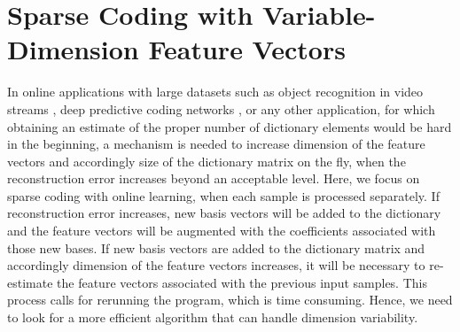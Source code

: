 \documentclass[journal]{IEEEtran}
\begin{document}
\section{Sparse Coding with Variable-Dimension Feature Vectors}  
\label{method}

In online applications with large datasets such as object recognition in video streams \cite{Zhao2011}, deep predictive coding networks \cite{Chalasani2013}, or any other application, for which obtaining an estimate of the proper number of dictionary elements would be hard in the beginning, a mechanism is needed to increase dimension of the feature vectors and accordingly size of the dictionary matrix on the fly, when the reconstruction error increases beyond an acceptable level. Here, we focus on sparse coding with online learning, when each sample is processed separately. If reconstruction error increases, new basis vectors will be added to the dictionary and the feature vectors will be augmented with the coefficients associated with those new bases. 
If new basis vectors are added to the dictionary matrix and accordingly dimension of the feature vectors increases, it will be necessary to re-estimate the feature vectors associated with the previous input samples. This process calls for rerunning the program, which is time consuming. Hence, we need to look for a more efficient algorithm that can handle dimension variability. 
\end{document}

